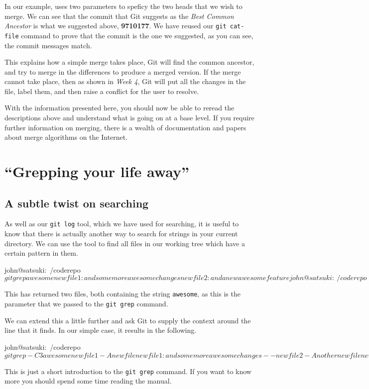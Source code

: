 In our example,  uses two parameters to speficy the two heads that we wish to merge.
We can see that the commit that Git suggests as the \emph{Best Common Ancestor} is what we suggested above, \textbf{9710177}.
We have reused our \texttt{git cat-file} command to prove that the commit is the one we suggested, as you can see, the commit messages match.

This explains how a simple merge takes place, Git will find the common ancestor, and try to merge in the differences to produce a merged version.
If the merge cannot take place, then as shown in \emph{Week 4}, Git will put all the changes in the file, label them, and then raise a conflict for the user to resolve.

With the information presented here, you should now be able to reread the descriptions above and understand what is going on at a base level.
If you require further information on merging, there is a wealth of documentation and papers about merge algorithms on the Internet.

\section{``Grepping your life away''}
\subsection{A subtle twist on searching}
As well as our \texttt{git log} tool, which we have used for searching, it is useful to know that there is actually another way to search for strings in your current directory.
We can use the  tool to find all files in our working tree which have a certain pattern in them.

\begin{code}
john@satsuki:~/coderepo$ git grep awesome
newfile1:and some more awesome changes
newfile2:and a new awesome feature
john@satsuki:~/coderepo$
\end{code}

This has returned two files, both containing the string \texttt{awesome}, as this is the parameter that we passed to the \texttt{git grep} command.

We can extend this a little further and ask Git to supply the context around the line that it finds.
In our simple case, it results in the following.

\begin{code}
john@satsuki:~/coderepo$ git grep -C3 awesome
newfile1-A new file
newfile1:and some more awesome changes
--
newfile2-Another new file
newfile2:and a new awesome feature
john@satsuki:~/coderepo$
\end{code}

This is just a short introduction to the \texttt{git grep} command.
If you want to know more you should spend some time reading the manual.

